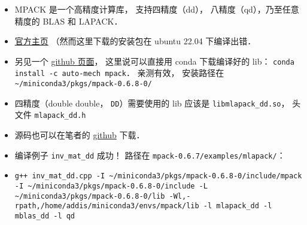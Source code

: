 
\begin{issues}
\issueDraft
\end{issues}

\begin{itemize}
\item MPACK 是一个高精度计算库， 支持四精度（dd）， 八精度（qd），乃至任意精度的 BLAS 和 LAPACK．
\item \href{https://mplapack.sourceforge.net/}{官方主页} （然而这里下载的安装包在 ubuntu 22.04 下编译出错．
\item 另见一个 \href{https://github.com/Auto-Mech/MPACK}{github 页面}， 这里说可以直接用 conda 下载编译好的 lib： \verb|conda install -c auto-mech mpack|． 亲测有效， 安装路径在 \verb|~/miniconda3/pkgs/mpack-0.6.8-0/|
\item 四精度（double double， \verb|DD|）需要使用的 lib 应该是 \verb|libmlapack_dd.so|， 头文件 \verb|mlapack_dd.h|
\item 源码也可以在笔者的 \href{https://github.com/MacroUniverse/MPACK-source}{github} 下载．
\item 编译例子 \verb|inv_mat_dd| 成功！ 路径在 \verb|mpack-0.6.7/examples/mlapack/|：
\item \verb|g++ inv_mat_dd.cpp -I ~/miniconda3/pkgs/mpack-0.6.8-0/include/mpack -I ~/miniconda3/pkgs/mpack-0.6.8-0/include -L ~/miniconda3/pkgs/mpack-0.6.8-0/lib -Wl,-rpath,/home/addis/miniconda3/envs/mpack/lib -l mlapack_dd -l mblas_dd -l qd|
\end{itemize}

